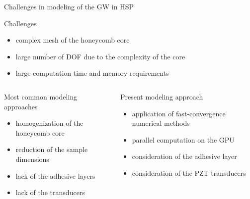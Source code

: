 \documentclass[10pt,aspectratio=169]{beamer} %
\begin{document}
\begin{frame}[label=frame5]{Challenges in modeling of the GW in HSP}
	\footnotesize
	\begin{block}{Challenges}
		\begin{itemize}
			\item complex mesh of the honeycomb core
			\item large number of DOF due to the complexity of the core
			\item large computation time and memory requirements
		\end{itemize}
	\end{block}
	\begin{columns}
	\begin{block}{Most common modeling approaches}
		\begin{itemize}
			\item homogenization of the honeycomb core
			\item reduction of the sample dimensions
			\item lack of the adhesive layers
			\item lack of the transducers
		\end{itemize}
	\end{block}
	\begin{block}{Present modeling approach}
	\begin{itemize}
		\item application of fast-convergence numerical methods
		\item parallel computation on the GPU
		\item consideration of the adhesive layer
		\item consideration of the PZT transducers
	\end{itemize}
	\end{block}
	\end{columns}
\end{frame}
\end{document}
